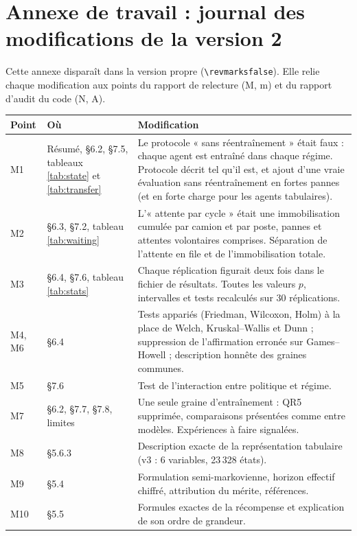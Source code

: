 \documentclass[11pt,a4paper]{article}
\begin{document}
\section*{Annexe de travail : journal des modifications de la version 2}

Cette annexe disparaît dans la version propre (\texttt{\textbackslash revmarksfalse}). Elle relie chaque modification aux points du rapport de relecture (M, m) et du rapport d'audit du code (N, A).

\footnotesize
\begin{longtable}{p{2.2cm}p{4.3cm}p{8.6cm}}
\toprule
\textbf{Point} & \textbf{Où} & \textbf{Modification} \\
\midrule
\endhead
M1 & Résumé, §6.2, §7.5, tableaux \ref{tab:state} et \ref{tab:transfer} & Le protocole « sans réentraînement » était faux : chaque agent est entraîné dans chaque régime. Protocole décrit tel qu'il est, et ajout d'une vraie évaluation sans réentraînement en fortes pannes (et en forte charge pour les agents tabulaires). \\
M2 & §6.3, §7.2, tableau \ref{tab:waiting} & L'« attente par cycle » était une immobilisation cumulée par camion et par poste, pannes et attentes volontaires comprises. Séparation de l'attente en file et de l'immobilisation totale. \\
M3 & §6.4, §7.6, tableau \ref{tab:stats} & Chaque réplication figurait deux fois dans le fichier de résultats. Toutes les valeurs $p$, intervalles et tests recalculés sur 30 réplications. \\
M4, M6 & §6.4 & Tests appariés (Friedman, Wilcoxon, Holm) à la place de Welch, Kruskal--Wallis et Dunn ; suppression de l'affirmation erronée sur Games--Howell ; description honnête des graines communes. \\
M5 & §7.6 & Test de l'interaction entre politique et régime. \\
M7 & §6.2, §7.7, §7.8, limites & Une seule graine d'entraînement : QR5 supprimée, comparaisons présentées comme entre modèles. Expériences à faire signalées. \\
M8 & §5.6.3 & Description exacte de la représentation tabulaire (v3 : 6 variables, 23\,328 états). \\
M9 & §5.4 & Formulation semi-markovienne, horizon effectif chiffré, attribution du mérite, références. \\
M10 & §5.5 & Formules exactes de la récompense et explication de son ordre de grandeur. \\

\end{longtable}
\end{document}
